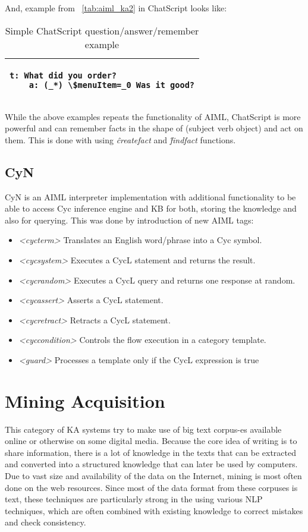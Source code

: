 And, example from \tablename~\ref{tab:aiml_ka2} in ChatScript looks like:

\begin{table}[H]
	\caption{Simple ChatScript question/answer/remember example}
	\label{tab:chatscript_ka2}
	\centering
	\begin{tabular}{l}
		\hline
		\lstset{breaklines=true}
		\begin{lstlisting}
t: What did you order?
	a: (_*) \$menuItem=_0 Was it good?
		\end{lstlisting}  \\
		\hline
	\end{tabular}
\end{table}

While the above examples repeats the functionality of AIML, ChatScript is more 
powerful and can remember facts in the shape of (subject verb object) and act on
them. This is done with using \emph{\^createfact} and \emph{\^findfact} 
functions.

\subsection {CyN} 
\label{section:r:cyn}
CyN is an AIML interpreter implementation with additional functionality
to be able to access Cyc inference engine and KB for both, storing the knowledge 
and also for querying\parencite{Coursey2004}. This was done by introduction of new 
AIML tags:
\begin{itemize}
	\item \emph{<cycterm>} Translates an English word/phrase into a Cyc symbol.
	\item \emph{<cycsystem>} Executes a CycL statement and returns the result.
	\item \emph{<cycrandom>} Executes a CycL query and returns one response at random.
	\item \emph{<cycassert>} Asserts a CycL statement.
	\item \emph{<cycretract>} Retracts a CycL statement.
	\item \emph{<cyccondition>} Controls the flow execution in a category template.
	\item \emph{<guard>} Processes a template only if the CycL expression is true
\end{itemize} 

\section{Mining Acquisition}
\label{section:r:miningacq}
This category of KA systems try to make use of big text corpus-es 
available online or otherwise on some digital media. Because the core idea of 
writing is to share information, there is a lot of knowledge in the texts that 
can be extracted and converted into a structured knowledge that can later be used 
by computers. Due to vast size and availability of the data on the Internet,
mining is most often done on the web resources. Since most of the data format
from these corpuses is text, these techniques are particularly strong in the
using various NLP techniques, which are often combined with existing knowledge
to correct mistakes and check consistency.

